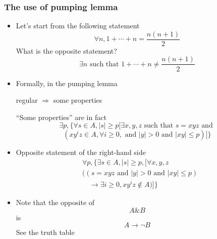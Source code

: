 




\begin{frame}[allowframebreaks] \frametitle{The use of pumping lemma}
  \begin{itemize}
    
  \item Let's start from the following statement
    \begin{equation*}
      \forall n, 1 + \cdots + n = \frac{n(n+1)}{2}
    \end{equation*}
    What is the opposite statement?
    \begin{equation*}
      \exists n \text{ such that } 1 + \cdots + n \neq  \frac{n(n+1)}{2}
    \end{equation*}
    
  \item Formally, in the pumping lemma
      \begin{center}
regular $\Rightarrow$ some properties    
  \end{center}
  ``Some properties'' are in fact
  \begin{equation*}
\exists p, \{\forall s \in A, |s|\geq p [ 
\exists x,y,z \text{ such that } s = xyz \text{ and }
\end{equation*}
\begin{equation*}
(xy^iz\in A, \forall i \geq 0,
\mbox{ and }
|y| > 0
\mbox{ and }
|xy|
\leq p)]\}
\end{equation*}
\item Opposite statement of the right-hand side
 \begin{equation}
   \begin{split}
& \forall p, \{\exists s \in A, |s|\geq p, 
[\forall x,y,z 
\\
& (
(s = xyz
\text{ and }
|y| > 0
 \mbox{ and }
 |xy|
 \leq p
)
\\
& \quad \rightarrow
\exists i \geq 0, xy^iz\notin A)]\} 
\end{split}
\label{eq:oppositepumping}
 \end{equation}
\item Note that the opposite of
  \begin{equation*}
    A \& B
  \end{equation*}
is
\begin{equation*}
  A \rightarrow \neg B
\end{equation*}
See the truth table


\end{itemize}
\end{frame}
